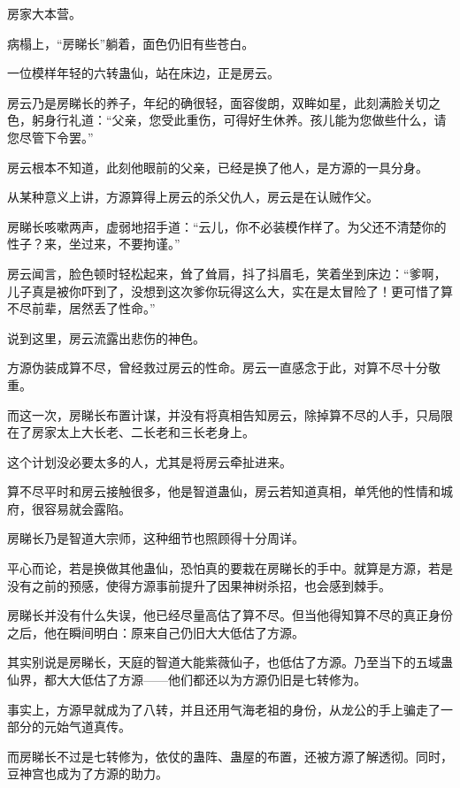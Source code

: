 
\begin{this_body}



房家大本营。

病榻上，“房睇长”躺着，面色仍旧有些苍白。

一位模样年轻的六转蛊仙，站在床边，正是房云。

房云乃是房睇长的养子，年纪的确很轻，面容俊朗，双眸如星，此刻满脸关切之色，躬身行礼道：“父亲，您受此重伤，可得好生休养。孩儿能为您做些什么，请您尽管下令罢。”

房云根本不知道，此刻他眼前的父亲，已经是换了他人，是方源的一具分身。

从某种意义上讲，方源算得上房云的杀父仇人，房云是在认贼作父。

房睇长咳嗽两声，虚弱地招手道：“云儿，你不必装模作样了。为父还不清楚你的性子？来，坐过来，不要拘谨。”

房云闻言，脸色顿时轻松起来，耸了耸肩，抖了抖眉毛，笑着坐到床边：“爹啊，儿子真是被你吓到了，没想到这次爹你玩得这么大，实在是太冒险了！更可惜了算不尽前辈，居然丢了性命。”

说到这里，房云流露出悲伤的神色。

方源伪装成算不尽，曾经救过房云的性命。房云一直感念于此，对算不尽十分敬重。

而这一次，房睇长布置计谋，并没有将真相告知房云，除掉算不尽的人手，只局限在了房家太上大长老、二长老和三长老身上。

这个计划没必要太多的人，尤其是将房云牵扯进来。

算不尽平时和房云接触很多，他是智道蛊仙，房云若知道真相，单凭他的性情和城府，很容易就会露陷。

房睇长乃是智道大宗师，这种细节也照顾得十分周详。

平心而论，若是换做其他蛊仙，恐怕真的要栽在房睇长的手中。就算是方源，若是没有之前的预感，使得方源事前提升了因果神树杀招，也会感到棘手。

房睇长并没有什么失误，他已经尽量高估了算不尽。但当他得知算不尽的真正身份之后，他在瞬间明白：原来自己仍旧大大低估了方源。

其实别说是房睇长，天庭的智道大能紫薇仙子，也低估了方源。乃至当下的五域蛊仙界，都大大低估了方源——他们都还以为方源仍旧是七转修为。

事实上，方源早就成为了八转，并且还用气海老祖的身份，从龙公的手上骗走了一部分的元始气道真传。

而房睇长不过是七转修为，依仗的蛊阵、蛊屋的布置，还被方源了解透彻。同时，豆神宫也成为了方源的助力。


\end{this_body}
